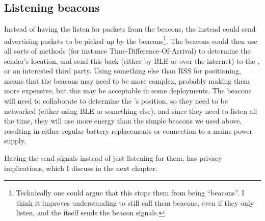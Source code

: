\subsection{Listening beacons}
Instead of having the \device listen for packets from the beacons, the \device instead could send advertising packets to be picked up by the beacons\footnote{Technically one could argue that this stops them from being ``beacons''.  I think it improves understanding to still call them beacons, even if they only listen, and the \device itself sends the beacon signals.}.
The beacons could then use all sorts of methods (for instance Time-Difference-Of-Arrival) to determine the sender's location, and send this back (either by BLE or over the internet) to the \device, or an interested third party.
Using something else than RSS for positioning, means that the beacons may need to be more complex, probably making them more expensive, but this may be acceptable in some deployments.
The beacons will need to collaborate to determine the \device's position, so they need to be networked (either using BLE or something else), and since they need to listen all the time, they will use more energy than the simple beacons we used above, resulting in either regular battery replacements or connection to a mains power supply.

Having the \device send signals instead of just listening for them, has privacy implications, which I discuss in the next chapter.




